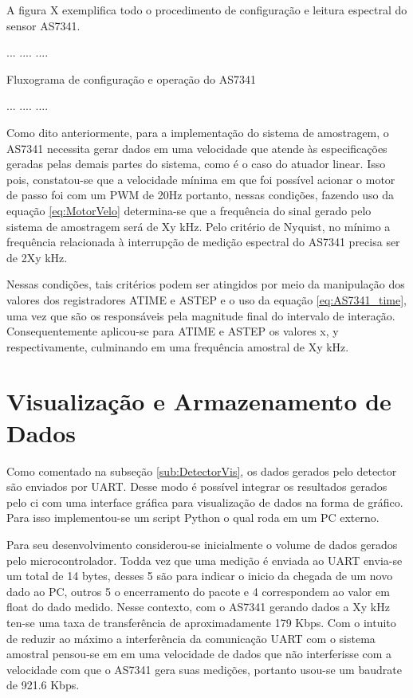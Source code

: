 \documentclass[oneside,openright,12pt]{ufsm_2021} %
\begin{document}
            \par A figura X exemplifica todo o procedimento de configuração e leitura espectral do sensor AS7341.
            \par ...    ....    ....
            \par Fluxograma de configuração e operação do AS7341
            \par ...    ....    ....   

            \par Como dito anteriormente, para a implementação do sistema de amostragem, o AS7341 necessita gerar dados em uma velocidade que atende às especificações geradas pelas demais partes do sistema, como é o caso do atuador linear. Isso pois, constatou-se que a velocidade mínima em que foi possível acionar o motor de passo foi com um PWM de 20Hz portanto, nessas condições, fazendo uso da equação \ref{eq:MotorVelo} determina-se que a frequência do sinal gerado pelo sistema de amostragem será de Xy kHz. Pelo critério de Nyquist, no mínimo a frequência relacionada à interrupção de medição espectral do AS7341 precisa ser de 2Xy kHz.
            \par Nessas condições, tais critérios podem ser atingidos por meio da manipulação dos valores dos registradores ATIME e ASTEP e o uso da equação \ref{eq:AS7341_time}, uma vez que são os responsáveis pela magnitude final do intervalo de interação. Consequentemente aplicou-se para ATIME e ASTEP os valores x, y respectivamente, culminando em uma frequência amostral de Xy kHz. 
            
    \section{Visualização e Armazenamento de Dados}
        \par Como comentado na subseção \ref{sub:DetectorVis}, os dados gerados pelo detector são enviados por UART. Desse modo é possível integrar os resultados gerados pelo ci com uma interface gráfica para visualização de dados na forma de gráfico. Para isso implementou-se um script Python o qual roda em um PC externo. 
        \par Para seu desenvolvimento considerou-se inicialmente o volume de dados gerados pelo microcontrolador. Todda vez que uma medição é enviada ao UART envia-se um total de 14 bytes, desses 5 são para indicar o inicio da chegada de um novo dado ao PC, outros 5 o encerramento do pacote e 4 correspondem ao valor em float do dado medido. Nesse contexto, com o AS7341 gerando dados a Xy kHz ten-se uma taxa de transferência de aproximadamente 179 Kbps. Com o intuito de reduzir ao máximo a interferência da comunicação UART com o sistema amostral pensou-se em em uma velocidade de dados que não interferisse com a velocidade com que o AS7341 gera suas medições, portanto usou-se um baudrate de 921.6 Kbps.
\end{document}
